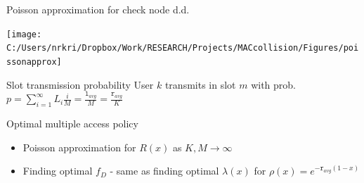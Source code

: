 \begin{frame}{Poisson approximation for check node d.d.}

\vspace{-0.15in}
\begin{center}
\hspace{14mm} \texttt{[image: C:/Users/nrkri/Dropbox/Work/RESEARCH/Projects/MACcollision/Figures/poissonapprox]}
\end{center}
\vspace{-0.15in}
\begin{block}{Slot transmission probability}
User $k$ transmits in slot $m$ with prob. $p = \sum_{i=1}^\infty L_i \frac{i}{M} = \frac{\texttt{l}_{avg}}{M} = \frac{\texttt{r}_{avg}}{K}$ \pause
\end{block}
\begin{block}{Optimal multiple access policy}
\begin{itemize}
\item Poisson approximation for $R(x)$ as $K,M \rightarrow \infty$
\item Finding optimal $f_D$ - same as finding optimal $\lambda(x)$ for $\rho(x) = e^{-{\texttt{r}}_{avg}(1-x)}$
\end{itemize}
\end{block}
\end{frame}
